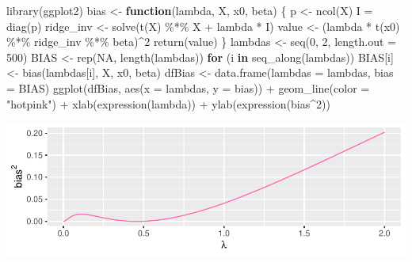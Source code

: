 \documentclass[
]{article}
\newenvironment{Shaded}{\begin{snugshade}}{\end{snugshade}}
\newcommand{\AttributeTok}[1]{\textcolor[rgb]{0.77,0.63,0.00}{#1}}
\newcommand{\ConstantTok}[1]{\textcolor[rgb]{0.00,0.00,0.00}{#1}}
\newcommand{\ControlFlowTok}[1]{\textcolor[rgb]{0.13,0.29,0.53}{\textbf{#1}}}
\newcommand{\DecValTok}[1]{\textcolor[rgb]{0.00,0.00,0.81}{#1}}
\newcommand{\FunctionTok}[1]{\textcolor[rgb]{0.00,0.00,0.00}{#1}}
\newcommand{\NormalTok}[1]{#1}
\newcommand{\OtherTok}[1]{\textcolor[rgb]{0.56,0.35,0.01}{#1}}
\newcommand{\SpecialCharTok}[1]{\textcolor[rgb]{0.00,0.00,0.00}{#1}}
\newcommand{\StringTok}[1]{\textcolor[rgb]{0.31,0.60,0.02}{#1}}
\begin{document}
\begin{Shaded}
\begin{Highlighting}[]
\FunctionTok{library}\NormalTok{(ggplot2)}
\NormalTok{bias }\OtherTok{\textless{}{-}} \ControlFlowTok{function}\NormalTok{(lambda, X, x0, beta) \{}
\NormalTok{    p }\OtherTok{\textless{}{-}} \FunctionTok{ncol}\NormalTok{(X)}
\NormalTok{    I }\OtherTok{=} \FunctionTok{diag}\NormalTok{(p)}
\NormalTok{    ridge\_inv }\OtherTok{\textless{}{-}} \FunctionTok{solve}\NormalTok{(}\FunctionTok{t}\NormalTok{(X) }\SpecialCharTok{\%*\%}\NormalTok{ X }\SpecialCharTok{+}\NormalTok{ lambda }\SpecialCharTok{*}\NormalTok{ I)}
\NormalTok{    value }\OtherTok{\textless{}{-}}\NormalTok{ (lambda }\SpecialCharTok{*} \FunctionTok{t}\NormalTok{(x0) }\SpecialCharTok{\%*\%}\NormalTok{ ridge\_inv }\SpecialCharTok{\%*\%}\NormalTok{ beta)}\SpecialCharTok{\^{}}\DecValTok{2}
    \FunctionTok{return}\NormalTok{(value)}
\NormalTok{\}}
\NormalTok{lambdas }\OtherTok{\textless{}{-}} \FunctionTok{seq}\NormalTok{(}\DecValTok{0}\NormalTok{, }\DecValTok{2}\NormalTok{, }\AttributeTok{length.out =} \DecValTok{500}\NormalTok{)}
\NormalTok{BIAS }\OtherTok{\textless{}{-}} \FunctionTok{rep}\NormalTok{(}\ConstantTok{NA}\NormalTok{, }\FunctionTok{length}\NormalTok{(lambdas))}
\ControlFlowTok{for}\NormalTok{ (i }\ControlFlowTok{in} \FunctionTok{seq\_along}\NormalTok{(lambdas)) BIAS[i] }\OtherTok{\textless{}{-}} \FunctionTok{bias}\NormalTok{(lambdas[i], X, x0, beta)}
\NormalTok{dfBias }\OtherTok{\textless{}{-}} \FunctionTok{data.frame}\NormalTok{(}\AttributeTok{lambdas =}\NormalTok{ lambdas, }\AttributeTok{bias =}\NormalTok{ BIAS)}
\FunctionTok{ggplot}\NormalTok{(dfBias, }\FunctionTok{aes}\NormalTok{(}\AttributeTok{x =}\NormalTok{ lambdas, }\AttributeTok{y =}\NormalTok{ bias)) }\SpecialCharTok{+} \FunctionTok{geom\_line}\NormalTok{(}\AttributeTok{color =} \StringTok{"hotpink"}\NormalTok{) }\SpecialCharTok{+} \FunctionTok{xlab}\NormalTok{(}\FunctionTok{expression}\NormalTok{(lambda)) }\SpecialCharTok{+}
    \FunctionTok{ylab}\NormalTok{(}\FunctionTok{expression}\NormalTok{(bias}\SpecialCharTok{\^{}}\DecValTok{2}\NormalTok{))}
\end{Highlighting}
\end{Shaded}

\begin{center}\includegraphics{Compulsory-1_files/figure-latex/unnamed-chunk-2-1} \end{center}
\end{document}
